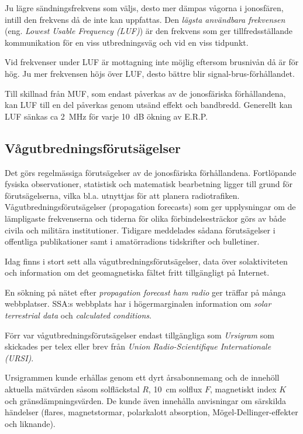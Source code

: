 Ju lägre sändningsfrekvens som väljs, desto mer dämpas vågorna i
jonosfären, intill den frekvens då de inte kan uppfattas.
Den \emph{lägsta användbara frekvensen}
(eng. \emph{Lowest Usable Frequency (LUF)}) är den
frekvens som ger tillfredsställande kommunikation för en viss
utbredningsväg och vid en viss tidpunkt.

Vid frekvenser under LUF är mottagning inte möjlig eftersom brusnivån
då är för hög.
Ju mer frekvensen höjs över LUF, desto bättre blir signal-brus-förhållandet.

Till skillnad från MUF, som endast påverkas av de jonosfäriska
förhållandena, kan LUF till en del påverkas genom utsänd effekt och bandbredd.
Generellt kan LUF sänkas ca 2~MHz för varje 10~dB ökning av E.R.P.

\subsection{Vågutbredningsförutsägelser}

Det görs regelmässiga förutsägelser av de jonosfäriska förhållandena.
Fortlöpande fysiska observationer, statistisk och matematisk bearbetning ligger
till grund för förutsägelserna, vilka bl.a. utnyttjas för att planera
radiotrafiken.
Vågutbredningsförutsägelser (propagation forecasts) som ger upplysningar om de
lämpligaste frekvenserna och tiderna för olika förbindelsesträckor görs av både
civila och militära institutioner.
Tidigare meddelades sådana förutsägelser i offentliga publikationer samt i 
amatörradions tidskrifter och bulletiner.

Idag finns i stort sett alla vågutbredningsförutsägelser, data över
solaktiviteten och information om det geomagnetiska fältet fritt tillgängligt på
Internet.

En sökning på nätet efter \emph{propagation forecast ham radio} ger träffar på
många webbplatser.
SSA:s webbplats har i högermarginalen information om \emph{solar terrestrial data}
och \emph{calculated conditions}.

Förr var vågutbredningsförutsägelser endast tillgängliga som \emph{Ursigram} som
skickades per telex eller brev från \emph{Union Radio-Scientifique
Internationale (URSI)}.

Ursigrammen kunde erhållas genom ett dyrt årsabonnemang och de innehöll aktuella
mätvärden såsom solfläckstal \(R\), 10~cm solflux \(F\), magnetiskt index \(K\)
och gränsdämpningsvärden.
De kunde även innehålla anvisningar om särskilda händelser (flares,
magnetstormar, polarkalott absorption, Mögel-Dellinger-effekter och liknande).

